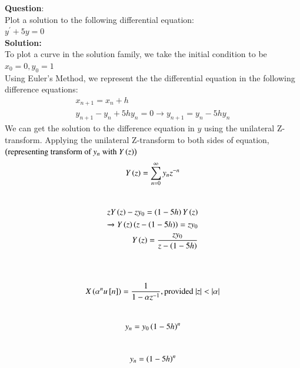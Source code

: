\documentclass[journal]{IEEEtran}
\begin{document}
\textbf{Question}:\\
Plot a solution to the following differential equation:\\
    $y^\prime + 5y = 0$
\\
\textbf{Solution: }\\
To plot a curve in the solution family, we take the initial condition to be\\
$x_0 = 0, y_0 = 1$\\
Using Euler's Method, we represent the the differential equation in the following difference equations:
\begin{align}
x_{n+1} = x_n + h\\
    y_{n+1} - y_n + 5hy_n  = 0 \xrightarrow{} y_{n+1} = y_n - 5hy_n
\end{align}
We can get the solution to the difference equation in $y$ using the unilateral Z-transform.
Applying the unilateral Z-transform to both sides of equation,$\left(\text{representing transform of $y_n$ with $Y\left(z\right)$}\right)$ 
\begin{align}
    Y\left(z\right) = \sum_{n=0}^{\infty}y_nz^{-n}\\
\end{align}
    \\
\begin{align}
    zY\left(z\right) -zy_0 = \left(1-5h\right)Y\left(z\right)\\
    \xrightarrow{} Y\left(z\right)\left(z - \left(1-5h\right)\right) = zy_0\\
    Y\left(z\right) = \frac{zy_0}{z-\left(1-5h\right)}\\
\end{align}
    \\
    \\
\begin{align}
    X\left(\alpha^nu{}\left[n\right]\right) = \frac{1}{1-\alpha z^{-1}}, \text{provided $|z| < |\alpha|$}\\
\end{align}
    \\
\begin{align}
    y_n = y_0\left(1-5h\right)^n\\
\end{align}
    \\
\begin{align}
    y_n = \left(1-5h\right)^n\\
\end{align}
\end{document}
